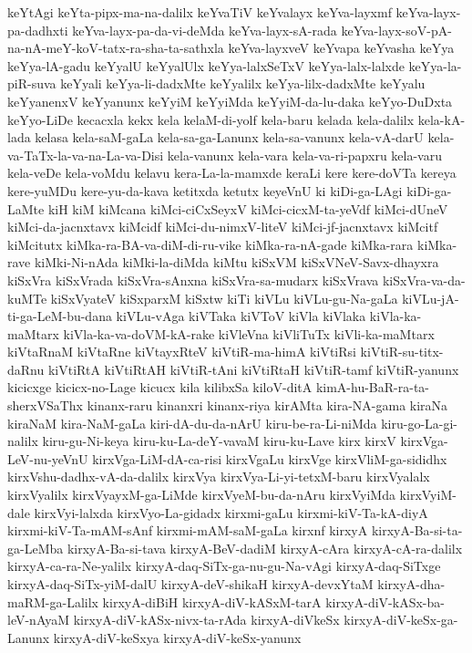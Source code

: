 {keYtAgi
keYta-pipx-ma-na-dalilx
keYvaTiV
keYvalayx
keYva-layxmf
keYva-layx-pa-dadhxti
keYva-layx-pa-da-vi-deMda
keYva-layx-sA-rada
keYva-layx-soV-pA-na-nA-meY-koV-tatx-ra-sha-ta-sathxla
keYva-layxveV
keYvapa
keYvasha
keYya
keYya-lA-gadu
keYyalU
keYyalUlx
keYya-lalxSeTxV
keYya-lalx-lalxde
keYya-la-piR-suva
keYyali
keYya-li-dadxMte
keYyalilx
keYya-lilx-dadxMte
keYyalu
keYyanenxV
keYyanunx
keYyiM
keYyiMda
keYyiM-da-lu-daka
keYyo-DuDxta
keYyo-LiDe
kecacxla
kekx
kela
kelaM-di-yolf
kela-baru
kelada
kela-dalilx
kela-kA-lada
kelasa
kela-saM-gaLa
kela-sa-ga-Lanunx
kela-sa-vanunx
kela-vA-darU
kela-va-TaTx-la-va-na-La-va-Disi
kela-vanunx
kela-vara
kela-va-ri-papxru
kela-varu
kela-veDe
kela-voMdu
kelavu
kera-La-la-mamxde
keraLi
kere
kere-doVTa
kereya
kere-yuMDu
kere-yu-da-kava
ketitxda
ketutx
keyeVnU
ki
kiDi-ga-LAgi
kiDi-ga-LaMte
kiH
kiM
kiMcana
kiMci-ciCxSeyxV
kiMci-cicxM-ta-yeVdf
kiMci-dUneV
kiMci-da-jacnxtavx
kiMcidf
kiMci-du-nimxV-liteV
kiMci-jf-jacnxtavx
kiMcitf
kiMcitutx
kiMka-ra-BA-va-diM-di-ru-vike
kiMka-ra-nA-gade
kiMka-rara
kiMka-rave
kiMki-Ni-nAda
kiMki-la-diMda
kiMtu
kiSxVM
kiSxVNeV-Savx-dhayxra
kiSxVra
kiSxVrada
kiSxVra-sAnxna
kiSxVra-sa-mudarx
kiSxVrava
kiSxVra-va-da-kuMTe
kiSxVyateV
kiSxparxM
kiSxtw
kiTi
kiVLu
kiVLu-gu-Na-gaLa
kiVLu-jA-ti-ga-LeM-bu-dana
kiVLu-vAga
kiVTaka
kiVToV
kiVla
kiVlaka
kiVla-ka-maMtarx
kiVla-ka-va-doVM-kA-rake
kiVleVna
kiVliTuTx
kiVli-ka-maMtarx
kiVtaRnaM
kiVtaRne
kiVtayxRteV
kiVtiR-ma-himA
kiVtiRsi
kiVtiR-su-titx-daRnu
kiVtiRtA
kiVtiRtAH
kiVtiR-tAni
kiVtiRtaH
kiVtiR-tamf
kiVtiR-yanunx
kicicxge
kicicx-no-Lage
kicucx
kila
kilibxSa
kiloV-ditA
kimA-hu-BaR-ra-ta-sherxVSaThx
kinanx-raru
kinanxri
kinanx-riya
kirAMta
kira-NA-gama
kiraNa
kiraNaM
kira-NaM-gaLa
kiri-dA-du-da-nArU
kiru-be-ra-Li-niMda
kiru-go-La-gi-nalilx
kiru-gu-Ni-keya
kiru-ku-La-deY-vavaM
kiru-ku-Lave
kirx
kirxV
kirxVga-LeV-nu-yeVnU
kirxVga-LiM-dA-ca-risi
kirxVgaLu
kirxVge
kirxVliM-ga-sididhx
kirxVshu-dadhx-vA-da-dalilx
kirxVya
kirxVya-Li-yi-tetxM-baru
kirxVyalalx
kirxVyalilx
kirxVyayxM-ga-LiMde
kirxVyeM-bu-da-nAru
kirxVyiMda
kirxVyiM-dale
kirxVyi-lalxda
kirxVyo-La-gidadx
kirxmi-gaLu
kirxmi-kiV-Ta-kA-diyA
kirxmi-kiV-Ta-mAM-sAnf
kirxmi-mAM-saM-gaLa
kirxnf
kirxyA
kirxyA-Ba-si-ta-ga-LeMba
kirxyA-Ba-si-tava
kirxyA-BeV-dadiM
kirxyA-cAra
kirxyA-cA-ra-dalilx
kirxyA-ca-ra-Ne-yalilx
kirxyA-daq-SiTx-ga-nu-gu-Na-vAgi
kirxyA-daq-SiTxge
kirxyA-daq-SiTx-yiM-dalU
kirxyA-deV-shikaH
kirxyA-devxYtaM
kirxyA-dha-maRM-ga-Lalilx
kirxyA-diBiH
kirxyA-diV-kASxM-tarA
kirxyA-diV-kASx-ba-leV-nAyaM
kirxyA-diV-kASx-nivx-ta-rAda
kirxyA-diVkeSx
kirxyA-diV-keSx-ga-Lanunx
kirxyA-diV-keSxya
kirxyA-diV-keSx-yanunx
}
